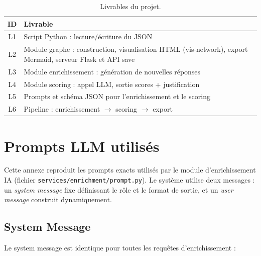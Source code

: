 \begin{table}[!htbp]
\centering
\begin{tabular}{c p{12cm}}
\toprule
\textbf{ID} & \textbf{Livrable} \\
\midrule
L1 & Script Python : lecture/\'ecriture du JSON \\
L2 & Module graphe : construction, visualisation HTML (vis-network), export Mermaid, serveur Flask et API save \\
L3 & Module enrichissement : g\'en\'eration de nouvelles r\'eponses \\
L4 & Module scoring : appel LLM, sortie scores + justification \\
L5 & Prompts et sch\'ema JSON pour l'enrichissement et le scoring \\
L6 & Pipeline : enrichissement $\rightarrow$ scoring $\rightarrow$ export \\
\bottomrule
\end{tabular}
\caption{Livrables du projet.}
\end{table}


\chapter{Prompts LLM utilis\'es}
\renewcommand{\thepage}{\thechapter-\arabic{page}}

Cette annexe reproduit les prompts exacts utilis\'es par le module d'enrichissement IA (fichier \texttt{services/enrichment/prompt.py}). Le syst\`eme utilise deux messages : un \textit{system message} fixe d\'efinissant le r\^ole et le format de sortie, et un \textit{user message} construit dynamiquement.

\section{System Message}

Le system message est identique pour toutes les requ\^etes d'enrichissement :

